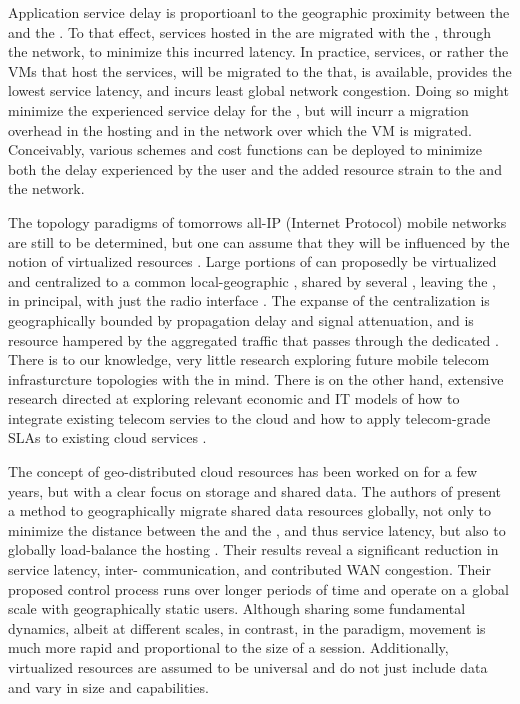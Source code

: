 Application service delay is proportioanl to the geographic proximity between the \ue{} and the \dc{}. To that effect, services hosted in the \xcloud{} are migrated with the \ue{}, through the network, to minimize this incurred latency. In practice, services, or rather the VMs that host the services, will be migrated to the \dc{} that, is available, provides the lowest service latency, and incurs least global network congestion. Doing so might minimize the experienced service delay for the \ue{}, but will incurr a migration overhead in the hosting \dc{} and in the network over which the VM is migrated. Conceivably, various schemes and cost functions can be deployed to minimize both the delay experienced by the user and the added resource strain to the \dc{} and the network.

The topology paradigms of tomorrows all-IP (Internet Protocol) mobile networks \cite{6144211,5357099} are still to be determined, but one can assume that they will be influenced by the notion of virtualized resources \cite{baroncelli2010network, chowdhury2009network}. Large portions of \rbss{} can proposedly be virtualized and centralized to a common local-geographic \dc, shared by several \rbss{}, leaving the \rbss, in principal, with just the radio interface \cite{melzercloud}. The expanse of the centralization is geographically bounded by propagation delay and signal attenuation, and is resource hampered by the aggregated traffic that passes through the dedicated \dc. There is to our knowledge, very little research exploring future mobile telecom infrasturcture topologies with the \xcloud{} in mind. There is on the other hand, extensive research directed at exploring relevant economic and IT models of how to integrate existing telecom servies to the cloud and how to apply telecom-grade SLAs to existing cloud services \cite{EricssonWhitePaper,6156350, 5357099}.

The concept of geo-distributed cloud resources has been worked on for a few years, but with a clear focus on storage and shared data. The authors of \cite{agarwal2010volley} present a method to geographically migrate shared data resources globally, not only to minimize the distance between the \ue{} and the \dc{}, and thus service latency, but also to globally load-balance the hosting \dcs{}. Their results reveal a significant reduction in service latency, inter-\dc{} communication, and contributed WAN congestion. Their proposed control process runs over longer periods of time and operate on a global scale with geographically static users. Although sharing some fundamental dynamics, albeit at different scales, in contrast, in the \xcloud{} paradigm, \ue{} movement is much more rapid and proportional to the size of a session. Additionally, \xcloud{} virtualized resources are assumed to be universal and do not just include data and vary in size and capabilities.


